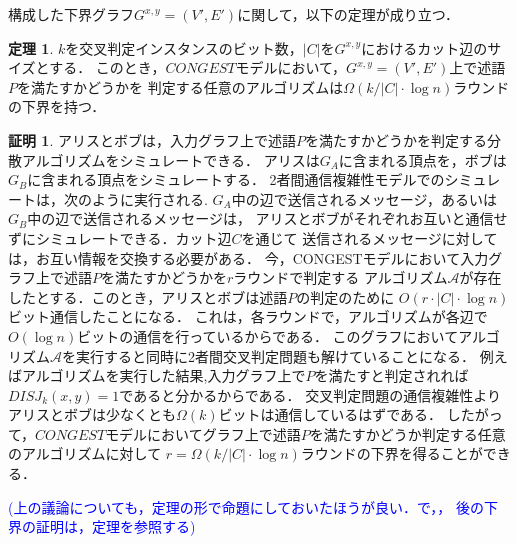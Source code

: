 \documentclass[12pt]{thesis}
\newcommand{\Izumi}[1]{\textcolor{blue}{(#1)}}
\newcommand{\CONGEST}{\textsf{CONGEST}}
\theoremstyle{definition}
\newtheorem{theorem}{定理}[chapter]
\newtheorem*{prf*}{証明}
\begin{document}
構成した下界グラフ$G^{x, y} = (V', E')$に関して，以下の定理が成り立つ．
\begin{theorem}
$k$を交叉判定インスタンスのビット数，$|C|$を$G^{x, y}$におけるカット辺のサイズとする．
このとき，$CONGEST$モデルにおいて，$G^{x, y} = (V', E')$上で述語$P$を満たすかどうかを
判定する任意のアルゴリズムは$\Omega (k / |C| \cdot \log n)$ラウンドの下界を持つ．
\label{lower}
\end{theorem}
\begin{prf*}
アリスとボブは，入力グラフ上で述語$P$を満たすかどうかを判定する分散アルゴリズムをシミュレートできる．
アリスは$G_{A}$に含まれる頂点を，ボブは$G_{B}$に含まれる頂点をシミュレートする．
2者間通信複雑性モデルでのシミュレートは，次のように実行される.
$G_{A}$中の辺で送信されるメッセージ，あるいは$G_{B}$中の辺で送信されるメッセージは，
アリスとボブがそれぞれお互いと通信せずにシミュレートできる．カット辺$C$を通じて
送信されるメッセージに対しては，お互い情報を交換する必要がある．
今，{\CONGEST}モデルにおいて入力グラフ上で述語$P$を満たすかどうかを$r$ラウンドで判定する
アルゴリズム$\mathcal{A}$が存在したとする．このとき，アリスとボブは述語$P$の判定のために
$O(r \cdot |C| \cdot \log n)$ビット通信したことになる．
これは，各ラウンドで，アルゴリズムが各辺で$O(\log n)$ビットの通信を行っているからである．
このグラフにおいてアルゴリズム$\mathcal{A}$を実行すると同時に2者間交叉判定問題も解けていることになる．
例えばアルゴリズムを実行した結果,入力グラフ上で$P$を満たすと判定されれば
$DISJ_{k} (x, y)=1$であると分かるからである．
交叉判定問題の通信複雑性よりアリスとボブは少なくとも$\Omega (k)$ビットは通信しているはずである．
したがって，$CONGEST$モデルにおいてグラフ上で述語$P$を満たすかどうか判定する任意のアルゴリズムに対して
$r = \Omega (k / |C| \cdot \log n)$ラウンドの下界を得ることができる．
\end{prf*}
\Izumi{上の議論についても，定理の形で命題にしておいたほうが良い．で，，
後の下界の証明は，定理を参照する}
\newpage
\end{document}
